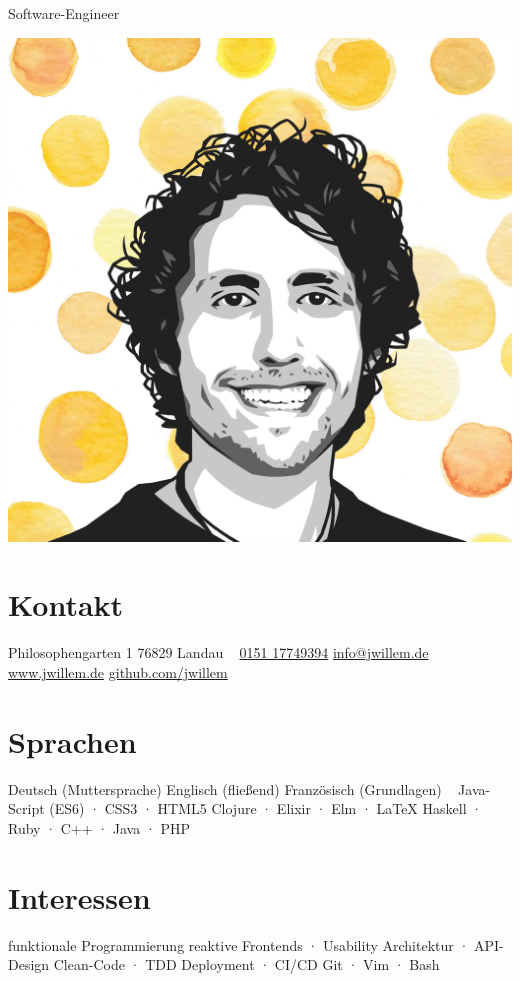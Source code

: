 \documentclass[
]{friggeri-cv}
\begin{document}
       {Software-Engineer}


\begin{aside}
\includegraphics[width=\textwidth]{avatar.png}
  \section{Kontakt}
    Philosophengarten 1
    76829 Landau
    ~
    \href{tel:+4915117749394}{0151 17749394}
    \href{mailto:info@jwillem.de}{info@jwillem.de}
    \href{http://jwillem.de}{www.jwillem.de}
    \href{http://github.com/jwillem}{github.com/jwillem}
  \section{Sprachen}
    Deutsch {\footnotesize{(Muttersprache)}}
    Englisch {\footnotesize{(fließend)}}
    Französisch {\footnotesize{(Grundlagen)}}
    ~
    {\footnotesize Java-Script (ES6) · CSS3 · HTML5}
    {\footnotesize Clojure · Elixir · Elm · \LaTeX}
    {\footnotesize Haskell · Ruby · C++ · Java · PHP}
  \section{Interessen}
  funktionale Programmierung
  reaktive Frontends · Usability
  Architektur · API-Design
  Clean-Code · TDD
  Deployment · CI/CD
  Git · Vim · Bash

\end{aside}
\end{document}
